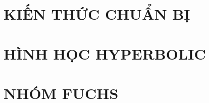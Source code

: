 \documentclass[11pt]{book}
\begin{document}



\tableofcontents{}
\chapter{KIẾN THỨC CHUẨN BỊ}


\chapter{HÌNH HỌC HYPERBOLIC}






% 
\chapter{NHÓM FUCHS}





\end{document}
